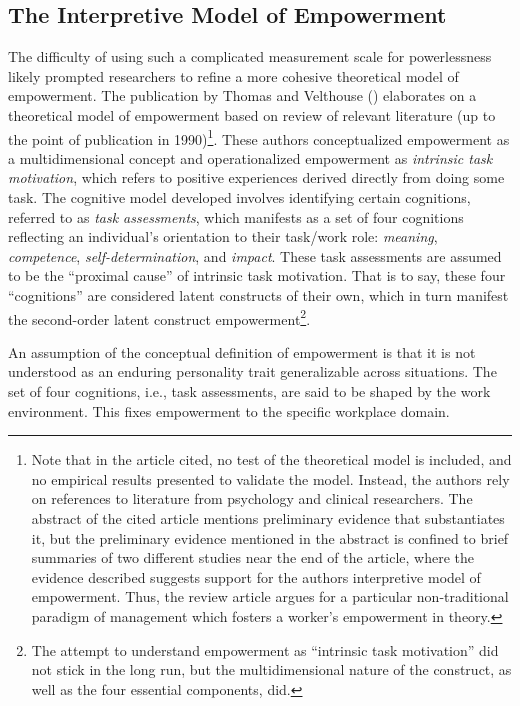 \documentclass[
  11pt,
  a4paper,
]{article}
\begin{document}
\subsection{The Interpretive Model of
Empowerment}\label{the-interpretive-model-of-empowerment}

The difficulty of using such a complicated measurement scale for
powerlessness likely prompted researchers to refine a more cohesive
theoretical model of empowerment. The publication by Thomas and
Velthouse () elaborates on a theoretical
model of empowerment based on review of relevant literature (up to the
point of publication in 1990)\footnote{Note that in the article cited,
  no test of the theoretical model is included, and no empirical results
  presented to validate the model. Instead, the authors rely on
  references to literature from psychology and clinical researchers. The
  abstract of the cited article mentions preliminary evidence that
  substantiates it, but the preliminary evidence mentioned in the
  abstract is confined to brief summaries of two different studies near
  the end of the article, where the evidence described suggests support
  for the authors interpretive model of empowerment. Thus, the review
  article argues for a particular non-traditional paradigm of management
  which fosters a worker's empowerment in theory.}. These authors
conceptualized empowerment as a multidimensional concept and
operationalized empowerment as \emph{intrinsic task motivation}, which
refers to positive experiences derived directly from doing some task.
The cognitive model developed involves identifying certain cognitions,
referred to as \emph{task assessments}, which manifests as a set of four
cognitions reflecting an individual's orientation to their task/work
role: \emph{meaning}, \emph{competence}, \emph{self-determination}, and
\emph{impact}. These task assessments are assumed to be the ``proximal
cause'' of intrinsic task motivation. That is to say, these four
``cognitions'' are considered latent constructs of their own, which in
turn manifest the second-order latent construct empowerment\footnote{The
  attempt to understand empowerment as ``intrinsic task motivation'' did
  not stick in the long run, but the multidimensional nature of the
  construct, as well as the four essential components, did.}.

An assumption of the conceptual definition of empowerment is that it is
not understood as an enduring personality trait generalizable across
situations. The set of four cognitions, i.e., task assessments, are said
to be shaped by the work environment. This fixes empowerment to the
specific workplace domain.
\end{document}
